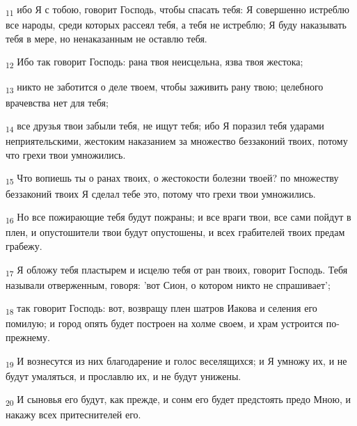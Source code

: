 \begin{tcolorbox}
\textsubscript{11} ибо Я с тобою, говорит Господь, чтобы спасать тебя: Я совершенно истреблю все народы, среди которых рассеял тебя, а тебя не истреблю; Я буду наказывать тебя в мере, но ненаказанным не оставлю тебя.
\end{tcolorbox}
\begin{tcolorbox}
\textsubscript{12} Ибо так говорит Господь: рана твоя неисцельна, язва твоя жестока;
\end{tcolorbox}
\begin{tcolorbox}
\textsubscript{13} никто не заботится о деле твоем, чтобы заживить рану твою; целебного врачевства нет для тебя;
\end{tcolorbox}
\begin{tcolorbox}
\textsubscript{14} все друзья твои забыли тебя, не ищут тебя; ибо Я поразил тебя ударами неприятельскими, жестоким наказанием за множество беззаконий твоих, потому что грехи твои умножились.
\end{tcolorbox}
\begin{tcolorbox}
\textsubscript{15} Что вопиешь ты о ранах твоих, о жестокости болезни твоей? по множеству беззаконий твоих Я сделал тебе это, потому что грехи твои умножились.
\end{tcolorbox}
\begin{tcolorbox}
\textsubscript{16} Но все пожирающие тебя будут пожраны; и все враги твои, все сами пойдут в плен, и опустошители твои будут опустошены, и всех грабителей твоих предам грабежу.
\end{tcolorbox}
\begin{tcolorbox}
\textsubscript{17} Я обложу тебя пластырем и исцелю тебя от ран твоих, говорит Господь. Тебя называли отверженным, говоря: 'вот Сион, о котором никто не спрашивает';
\end{tcolorbox}
\begin{tcolorbox}
\textsubscript{18} так говорит Господь: вот, возвращу плен шатров Иакова и селения его помилую; и город опять будет построен на холме своем, и храм устроится по-прежнему.
\end{tcolorbox}
\begin{tcolorbox}
\textsubscript{19} И вознесутся из них благодарение и голос веселящихся; и Я умножу их, и не будут умаляться, и прославлю их, и не будут унижены.
\end{tcolorbox}
\begin{tcolorbox}
\textsubscript{20} И сыновья его будут, как прежде, и сонм его будет предстоять предо Мною, и накажу всех притеснителей его.
\end{tcolorbox}
